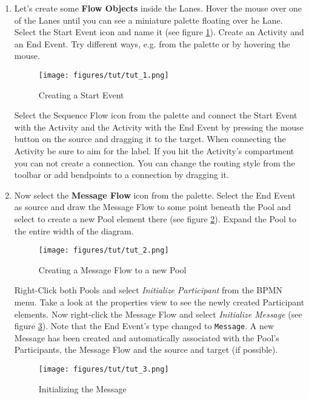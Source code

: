 \begin{enumerate}
\item Let's create some \textbf{Flow Objects} inside the Lanes. Hover the mouse over one of the Lanes until you can see a miniature palette floating over he Lane. Select the Start Event icon and name it (see figure \ref{fig:tut_1}). Create an Activity and an End Event. Try different ways, e.g. from the palette or by hovering the mouse.

\begin{figure}[htp]
\centering
\texttt{[image: figures/tut/tut\_1.png]}
\caption{Creating a Start Event}
\label{fig:tut_1}
\end{figure}


Select the Sequence Flow icon from the palette and connect the Start Event with the Activity and the Activity with the End Event by pressing the mouse button on the source and dragging it to the target. When connecting the Activity be sure to aim for the label. If you hit the Activity's compartment you can not create a connection. You can change the routing style from the toolbar or add bendpoints to a connection by dragging it.

\item Now select the \textbf{Message Flow} icon from the palette. Select the End Event as source and draw the Message Flow to some point beneath the Pool and select to create a new Pool element there (see figure \ref{fig:tut_2}). Expand the Pool to the entire width of the diagram.

\begin{figure}[htp]
\centering
\texttt{[image: figures/tut/tut\_2.png]}
\caption{Creating a Message Flow to a new Pool}
\label{fig:tut_2}
\end{figure}

Right-Click both Pools and select \emph{Initialize Participant} from the BPMN menu. Take a look at the properties view to see the newly created Participant elements. Now right-click the Message Flow and select \emph{Initialize Message} (see figure \ref{fig:tut_3}). Note that the End Event's type changed to \texttt{Message}. A new Message has been created and automatically associated with the Pool's Participants, the Message Flow and the source and target (if possible).

\begin{figure}[htp]
\centering
\texttt{[image: figures/tut/tut\_3.png]}
\caption{Initializing the Message}
\label{fig:tut_3}
\end{figure}


\end{enumerate}
